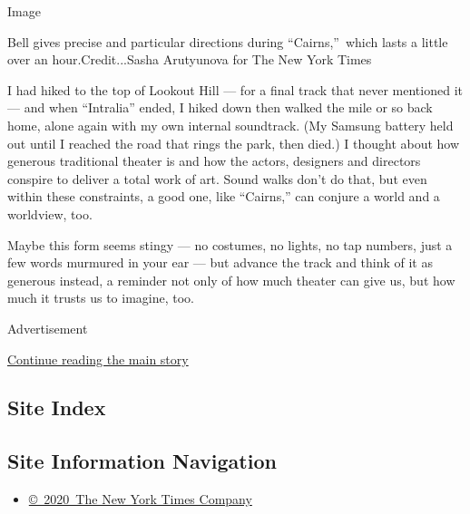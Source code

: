 Image

Bell gives precise and particular directions during ``Cairns,''~which
lasts a little over an hour.Credit...Sasha Arutyunova for The New York
Times

I had hiked to the top of Lookout Hill --- for a final track that never
mentioned it --- and when ``Intralia'' ended, I hiked down then walked
the mile or so back home, alone again with my own internal soundtrack.
(My Samsung battery held out until I reached the road that rings the
park, then died.) I thought about how generous traditional theater is
and how the actors, designers and directors conspire to deliver a total
work of art. Sound walks don't do that, but even within these
constraints, a good one, like ``Cairns,'' can conjure a world and a
worldview, too.

Maybe this form seems stingy --- no costumes, no lights, no tap numbers,
just a few words murmured in your ear --- but advance the track and
think of it as generous instead, a reminder not only of how much theater
can give us, but how much it trusts us to imagine, too.

Advertisement

\protect\hyperlink{after-bottom}{Continue reading the main story}

\hypertarget{site-index}{%
\subsection{Site Index}\label{site-index}}

\hypertarget{site-information-navigation}{%
\subsection{Site Information
Navigation}\label{site-information-navigation}}

\begin{itemize}
\tightlist
\item
  \href{https://help.nytimes3xbfgragh.onion/hc/en-us/articles/115014792127-Copyright-notice}{©~2020~The
  New York Times Company}
\end{itemize}

